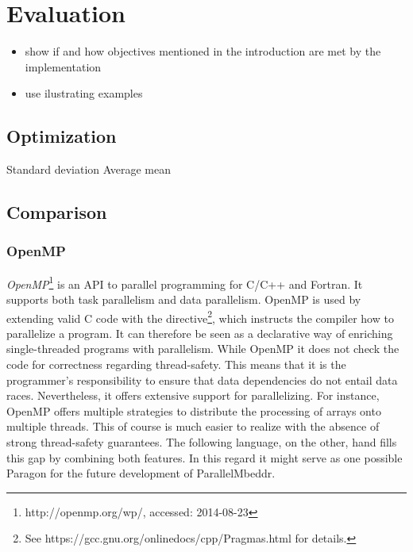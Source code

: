 \chapter{Evaluation}

\begin{itemize}
\item show if and how objectives mentioned in the introduction are met by the implementation
\item use ilustrating examples
\end{itemize}

\section{Optimization}
Standard deviation
Average mean
\section{Comparison}

\subsection{OpenMP}
\textit{OpenMP}\footnote{http://openmp.org/wp/, accessed: 2014-08-23} is an API to parallel programming for C/C++ and Fortran\cite[p.~1]{OpenMP}. It supports both task parallelism and data parallelism. OpenMP is used by extending valid C code with the  directive\footnote{See https://gcc.gnu.org/onlinedocs/cpp/Pragmas.html for details.}, which instructs the compiler how to parallelize a program. It can therefore be seen as a declarative way of enriching single-threaded programs with parallelism. While OpenMP it does not check the code for correctness regarding thread-safety. This means that it is the programmer's responsibility to ensure that data dependencies do not entail data races. Nevertheless, it offers extensive support for parallelizing. For instance, OpenMP offers multiple strategies to distribute the processing of arrays onto multiple threads. This of course is much easier to realize with the absence of strong thread-safety guarantees. The following language, on the other, hand fills this gap by combining both features. In this regard it might serve as one possible Paragon for the future development of ParallelMbeddr.

